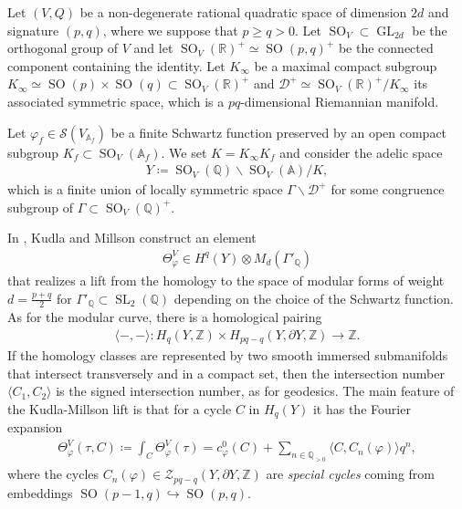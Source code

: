 \documentclass[11pt]{article} %
\newcommand{\8}{\infty}
\newcommand{\Z}{\mathbb{Z}}
\newcommand{\SO}{\operatorname{SO}}
\newcommand{\SL}{\operatorname{SL}}
\newcommand{\GL}{\operatorname{GL}}
\newcommand{\D}{\mathcal{D}}
\newcommand{\R}{\mathbb{R}}
\newcommand{\A}{\mathbb{A}}
\newcommand{\Q}{\mathbb{Q}}
\newcommand{\Scal}{\mathcal{S}}
\newcommand{\Zcal}{\mathcal{Z}}
\newcommand{\fin}{f}
\theoremstyle{mytheoremstyle}
\theoremstyle{remark}
\numberwithin{equation}{section}
\begin{document}
 Let $(V,Q)$ be a non-degenerate rational quadratic space of dimension $2d$ and signature $(p,q)$, where we suppose that $p \geq q>0$. Let $\SO_V \subset \GL_{2d}$ be the orthogonal group of $V$ and let $\SO_V(\R)^+\simeq \SO(p,q)^+$ be the connected component containing the identity. Let $K_\8$ be a maximal compact subgroup $K_\8 \simeq \SO(p)\times \SO(q) \subset \SO_V(\R)^+$ and $\D^+ \simeq \SO_V(\R)^+/K_\8$ its associated symmetric space, which is a $pq$-dimensional Riemannian manifold.

{ Let $\varphi_\fin \in \Scal(V_{ \A_\fin})$ be a finite Schwartz function preserved by an open compact subgroup $K_\fin \subset \SO_V(\A_\fin)$.} We set $K=K_\8K_\fin$ and consider the adelic space 
\begin{align}
    Y \coloneqq \SO_V(\Q) \backslash \SO_V(\A)/K,
\end{align} which is a finite union of locally symmetric space $\Gamma \backslash \D^+$ for some congruence subgroup of $\Gamma \subset \SO_V(\Q)^+$. 
 
 In \cite{km2,km3}, Kudla and Millson construct an element
\begin{align}
\Theta^V_\varphi \in H^q(Y) \otimes M_{d} (\Gamma'_\Q)   
\end{align}
that realizes a lift from the homology to the space of modular forms of weight $d=\frac{p+q}{2}$ for $\Gamma'_\Q \subset \SL_2(\Q)$ depending on the choice of the Schwartz function. As for the modular curve, there is a homological pairing 
\begin{align}
    \langle - , - \rangle \colon H_q(Y,\Z) \times { H_{pq-q}(Y, \partial Y, \Z)} \longrightarrow \Z.
\end{align}
If the homology classes are represented by two smooth immersed submanifolds that intersect transversely and in a compact set, then the intersection number $\langle C_1,C_2 \rangle$ is the signed intersection number, as for geodesics. The main feature of the Kudla-Millson lift is that for a cycle $C$ in $H_q(Y)$ it has the Fourier expansion
\begin{align}
\Theta^V_\varphi(\tau,C) \coloneqq \int_C\Theta^V_\varphi(\tau)=c^0_\varphi(C)+ \sum_{n \in \Q_{>0}} \langle C,C_n(\varphi) \rangle q^n,
\end{align}
where the cycles $C_n(\varphi) \in \Zcal_{pq-q}(Y,\partial Y,\Z)$ are {\em special cycles} coming from embeddings $\SO(p-1,q) \hookrightarrow \SO(p,q)$. 
\end{document}
